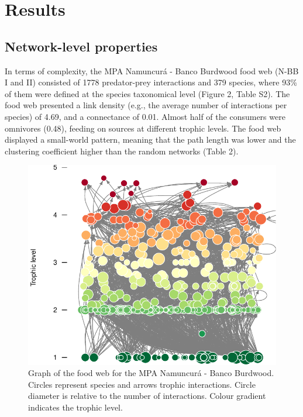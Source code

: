 \documentclass[preprint, 3p,
authoryear]{elsarticle} %
\begin{document}
\hypertarget{results}{%
\section{Results}\label{results}}

\hypertarget{network-level-properties}{%
\subsection{Network-level properties}\label{network-level-properties}}

In terms of complexity, the MPA Namuncurá - Banco Burdwood food web
(N-BB I and II) consisted of 1778 predator-prey interactions and 379
species, where 93\% of them were defined at the species taxonomical
level (Figure 2, Table S2). The food web presented a link density (e.g.,
the average number of interactions per species) of 4.69, and a
connectance of 0.01. Almost half of the consumers were omnivores (0.48),
feeding on sources at different trophic levels. The food web displayed a
small-world pattern, meaning that the path length was lower and the
clustering coefficient higher than the random networks (Table 2).

\newpage

\begin{figure}

{\centering \includegraphics{MS_Burdwood_foodweb_files/figure-latex/figure2-1} 

}

\caption{Graph of the food web for the MPA Namuncurá - Banco Burdwood. Circles represent species and arrows trophic interactions. Circle diameter is relative to the number of interactions. Colour gradient indicates the trophic level.}\label{fig:figure2}
\end{figure}
\end{document}
